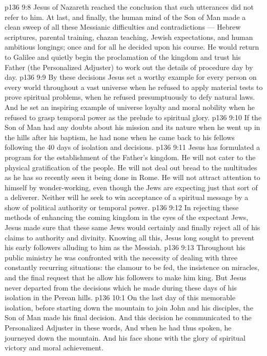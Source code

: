 \vs p136 9:8 Jesus of Nazareth reached the conclusion that such utterances did not refer to him. At last, and finally, the human mind of the Son of Man made a clean sweep of all these Messianic difficulties and contradictions --- Hebrew scriptures, parental training, chazan teaching, Jewish expectations, and human ambitious longings; once and for all he decided upon his course. He would return to Galilee and quietly begin the proclamation of the kingdom and trust his Father (the Personalized Adjuster) to work out the details of procedure day by day.
\vs p136 9:9 \pc By these decisions Jesus set a worthy example for every person on every world throughout a vast universe when he refused to apply material tests to prove spiritual problems, when he refused presumptuously to defy natural laws. And he set an inspiring example of universe loyalty and moral nobility when he refused to grasp temporal power as the prelude to spiritual glory.
\vs p136 9:10 \pc If the Son of Man had any doubts about his mission and its nature when he went up in the hills after his baptism, he had none when he came back to his fellows following the 40 days of isolation and decisions.
\vs p136 9:11 Jesus has formulated a program for the establishment of the Father’s kingdom. He will not cater to the physical gratification of the people. He will not deal out bread to the multitudes as he has so recently seen it being done in Rome. He will not attract attention to himself by wonder\hyp{}working, even though the Jews are expecting just that sort of a deliverer. Neither will he seek to win acceptance of a spiritual message by a show of political authority or temporal power.
\vs p136 9:12 In rejecting these methods of enhancing the coming kingdom in the eyes of the expectant Jews, Jesus made sure that these same Jews would certainly and finally reject all of his claims to authority and divinity. Knowing all this, Jesus long sought to prevent his early followers alluding to him as the Messiah.
\vs p136 9:13 Throughout his public ministry he was confronted with the necessity of dealing with three constantly recurring situations: the clamour to be fed, the insistence on miracles, and the final request that he allow his followers to make him king. But Jesus never departed from the decisions which he made during these days of his isolation in the Perean hills.
\vs p136 10:1 On the last day of this memorable isolation, before starting down the mountain to join John and his disciples, the Son of Man made his final decision. And this decision he communicated to the Personalized Adjuster in these words,  And when he had thus spoken, he journeyed down the mountain. And his face shone with the glory of spiritual victory and moral achievement.
\quizlink
